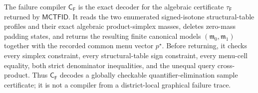 The failure compiler \(\mathsf C_{\mathsf F}\) is the exact decoder for the algebraic certificate \(\tau_{\mathsf F}\) returned by \(\mathsf{MCTFID}\).  It reads the two enumerated signed-isotone structural-table profiles and their exact algebraic product-simplex masses, deletes zero-mass padding states, and returns the resulting finite canonical models \((\mathfrak m_0,\mathfrak m_1)\) together with the recorded common menu vector \(p^{\star}\).  Before returning, it checks every simplex constraint, every structural-table sign constraint, every menu-cell equality, both strict denominator inequalities, and the unequal query cross-product.  Thus \(\mathsf C_{\mathsf F}\) decodes a globally checkable quantifier-elimination sample certificate; it is not a compiler from a district-local graphical failure trace.